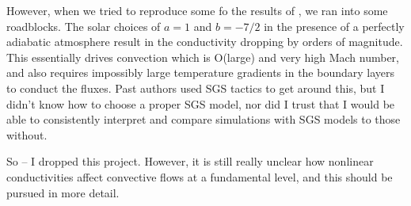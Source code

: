 However, when we tried to reproduce some fo the results of \cite{kapyla&all2017}, we ran into some roadblocks.
The solar choices of $a = 1$ and $b = -7/2$ in the presence of a perfectly adiabatic atmosphere result in the conductivity dropping by orders of magnitude.
This essentially drives convection which is O(large) and very high Mach number, and also requires impossibly large temperature gradients in the boundary layers to conduct the fluxes.
Past authors used SGS tactics to get around this, but I didn't know how to choose a proper SGS model, nor did I trust that I would be able to consistently interpret and compare simulations with SGS models to those without.

So -- I dropped this project.
However, it is still really unclear how nonlinear conductivities affect convective flows at a fundamental level, and this should be pursued in more detail.

